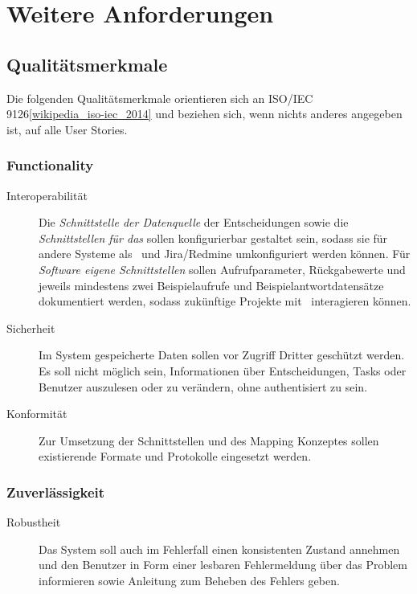\section{Weitere Anforderungen}

	\subsection{Qualitätsmerkmale}
		Die folgenden Qualitätsmerkmale orientieren sich an ISO/IEC 9126\ref{wikipedia_iso-iec_2014} und beziehen sich, wenn nichts anderes angegeben ist, auf alle User Stories.

		\subsubsection{Functionality}
		\begin{description}
			\item[Interoperabilität] Die \textit{Schnittstelle der Datenquelle} der Entscheidungen sowie die \textit{Schnittstellen für das \ppt} sollen konfigurierbar gestaltet sein, sodass sie für andere Systeme als \cdar\ und Jira/Redmine umkonfiguriert werden können. 
			Für \textit{Software eigene Schnittstellen} sollen Aufrufparameter, Rückgabewerte und jeweils mindestens zwei Beispielaufrufe und Beispielantwortdatensätze dokumentiert werden, sodass zukünftige Projekte mit \eeppi\ interagieren können.
			\item[Sicherheit] Im System gespeicherte Daten sollen vor Zugriff Dritter geschützt werden.
			Es soll nicht möglich sein, Informationen über Entscheidungen, Tasks oder Benutzer auszulesen oder zu verändern, 
			ohne authentisiert zu sein.
			\item[Konformität] Zur Umsetzung der Schnittstellen und des Mapping Konzeptes sollen existierende Formate und Protokolle eingesetzt werden.
		\end{description}
		
		
		\subsubsection{Zuverlässigkeit}
		\begin{description}
			\item[Robustheit] Das System soll auch im Fehlerfall einen konsistenten Zustand annehmen und den Benutzer in Form einer lesbaren Fehlermeldung über das Problem informieren sowie Anleitung zum Beheben des Fehlers geben.
		\end{description}
		

